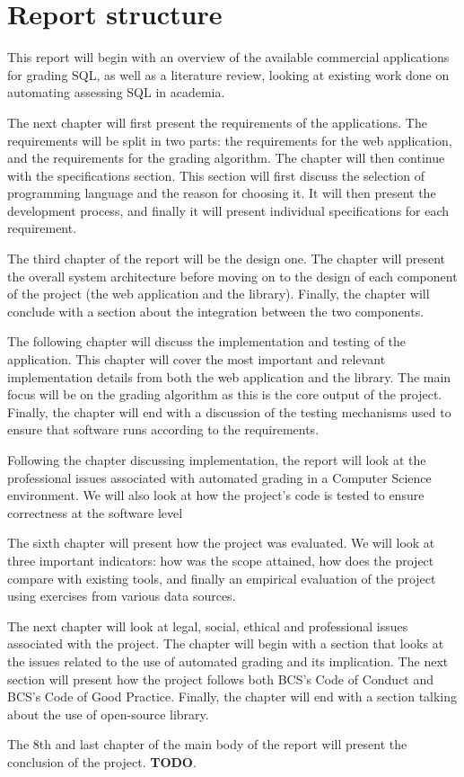 \section{Report structure}

This report will begin with an overview of the available commercial applications for grading SQL, as well as a literature review, looking at existing work done on automating assessing SQL in academia.

The next chapter will first present the requirements of the applications. The requirements will be split in two parts: the requirements for the web application, and the requirements for the grading algorithm. The chapter will then continue with the specifications section. This section will first discuss the selection of programming language and the reason for choosing it. It will then present the development process, and finally it will present individual specifications for each requirement.

The third chapter of the report will be the design one. The chapter will present the overall system architecture before moving on to the design of each component of the project (the web application and the library). Finally, the chapter will conclude with a section about the integration between the two components.

The following chapter will discuss the implementation and testing of the application. This chapter will cover the most important and relevant implementation details from both the web application and the library. The main focus will be on the grading algorithm as this is the core output of the project. Finally, the chapter will end with a discussion of the testing mechanisms used to ensure that software runs according to the requirements.

Following the chapter discussing implementation, the report will look at the professional issues associated with automated grading in a Computer Science environment. We will also look at how the project's code is tested to ensure correctness at the software level

The sixth chapter will present how the project was evaluated. We will look at three important indicators: how was the scope attained, how does the project compare with existing tools, and finally an empirical evaluation of the project using exercises from various data sources.

The next chapter will look at legal, social, ethical and professional issues associated with the project. The chapter will begin with a section that looks at the issues related to the use of automated grading and its implication. The next section will present how the project follows both BCS's Code of Conduct and BCS's Code of Good Practice. Finally, the chapter will end with a section talking about the use of open-source library.

The 8th and last chapter of the main body of the report will present the conclusion of the project. \textbf{TODO}.